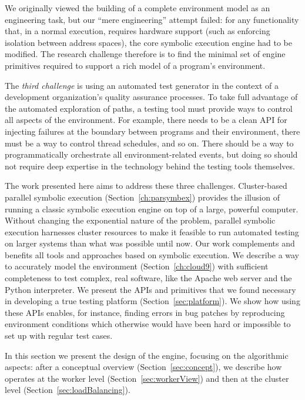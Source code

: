 We originally viewed the building of a complete environment model as an engineering task, but our ``mere engineering'' attempt failed: for any functionality that, in a normal execution, requires hardware support (such as enforcing isolation between address spaces), the core symbolic execution engine had to be modified.  The research challenge therefore is to find the minimal set of engine primitives required to support a rich model of a program's environment. 

The {\em third challenge} is using an automated test generator in the context of a development organization's quality assurance processes.  To take full advantage of the automated exploration of paths, a testing tool must provide ways to control all aspects of the environment.  For example, there needs to be a clean API for injecting failures at the boundary between programs and their environment, there must be a way to control thread schedules, and so on.  There should be a way to programmatically orchestrate all environment-related events, but doing so should not require deep expertise in the technology behind the testing tools themselves.

The work presented here aims to address these three challenges.  Cluster-based parallel symbolic execution (Section~\ref{ch:parsymbex}) provides the illusion of running a classic symbolic execution engine on top of a large, powerful computer.  Without changing the exponential nature of the problem, parallel symbolic execution harnesses cluster resources to make it feasible to run automated testing on larger systems than what was possible until now. Our work complements and benefits all tools and approaches based on symbolic execution.  We describe a way to accurately model the environment (Section~\ref{ch:cloud9}) with sufficient completeness to test complex, real software, like the Apache web server and the Python interpreter.  We present the APIs and primitives that we found necessary in developing a true testing platform (Section~\ref{sec:platform}).  We show how using these APIs enables, for instance, finding errors in bug patches by reproducing environment conditions which otherwise would have been hard or impossible to set up with regular test cases.

In this section we present the design of the \cnine engine, focusing on the algorithmic aspects: after a conceptual overview (Section~\ref{sec:concept}), we describe how \cnine operates at the worker level (Section~\ref{sec:workerView}) and then at the cluster level (Section~\ref{sec:loadBalancing}).

